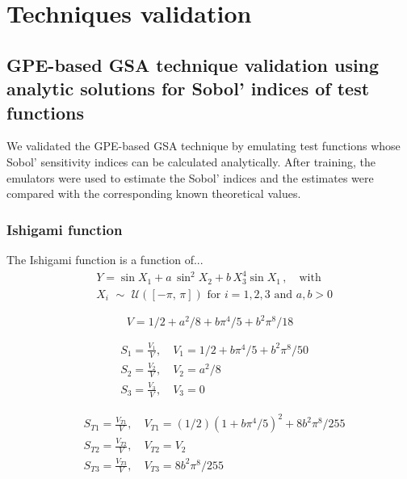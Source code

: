 \chapter{Techniques validation}\label{cha:chapterA}

%
%
%
\section{GPE-based GSA technique validation using analytic solutions for Sobol' indices of test functions}\label{chA:GPE-based_GSA_technique_validation_using_analytic_solutions_for_Sobol'_indices_of_test_functions}
We validated the GPE-based GSA technique by emulating test functions whose Sobol' sensitivity indices can be calculated analytically. After training, the emulators were used to estimate the Sobol' indices and the estimates were compared with the corresponding known theoretical values.

%
%
%
\subsection{Ishigami function}
The Ishigami function is a function of...
%
\begin{align}\label{eq:ishigamifun}
	& Y = \sin{X_1} + a\,\sin^2{X_2} + b\,X_3^4\sin{X_1}\,,\quad\text{with} \\
	& X_i\,\,\sim\,\,\mathcal{U}([-\pi,\,\pi])\,\,\text{for}\,\,i=1,2,3\,\,\text{and}\,\, a,b>0
\end{align}

\begin{equation}
	V = 1/2 + a^2/8 + b\pi^4/5 + b^2\pi^8/18
\end{equation}

\begin{align}
	& S_{1} = \frac{V_{1}}{V},\quad V_{1} = 1/2 + b\pi^4/5 + b^2\pi^8/50 \\
	& S_{2} = \frac{V_{2}}{V},\quad V_{2} = a^2/8 \\
	& S_{3} = \frac{V_{3}}{V},\quad V_{3} = 0
\end{align}

\begin{align}
	& S_{T1} = \frac{V_{T1}}{V},\quad V_{T1} = (1/2)(1+b\pi^4/5)^2 + 8b^2\pi^8/255 \\
	& S_{T2} = \frac{V_{T2}}{V},\quad V_{T2} = V_2 \\
	& S_{T3} = \frac{V_{T3}}{V},\quad V_{T3} = 8b^2\pi^8/255
\end{align}

